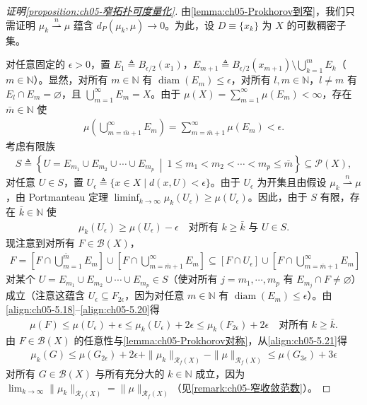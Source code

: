 \documentclass[../../main.tex]{subfiles}%
\begin{document}
\begin{proof}[证明\cref{proposition:ch05-窄拓扑可度量化}]
由\cref{lemma:ch05-Prokhorov到窄}，我们只需证明 $\mu_k\stackrel{n}{\rightharpoonup}\mu$ 蕴含 $d_P(\mu_k,\mu)\to0$。为此，设 $D\equiv\{x_k\}$ 为 $X$ 的可数稠密子集。

对任意固定的 $\epsilon>0$，置 $E_1\triangleq B_{\epsilon/2}(x_1)$，$E_{m+1}\triangleq B_{\epsilon/2}(x_{m+1})\setminus\bigcup_{k=1}^m E_k$（$m\in\mathbb{N}$）。显然，对所有 $m\in\mathbb{N}$ 有 $\operatorname{diam}(E_m)\leqslant\epsilon$，对所有 $l,m\in\mathbb{N}$，$l\neq m$ 有 $E_l\cap E_m=\varnothing $，且 $\bigcup_{m=1}^\infty E_m=X$。由于 $\mu(X)=\sum_{m=1}^\infty\mu(E_m)<\infty$，存在 $\bar{m}\in\mathbb{N}$ 使
\begin{align}
\mu\!\left(\bigcup_{m=\bar{m}+1}^\infty E_m\right)
=\sum_{m=\bar{m}+1}^\infty\mu(E_m)<\epsilon.\label{align:ch05-5.18}
\end{align}
考虑有限族
\begin{align*}
S\triangleq \left\{U=E_{m_1}\cup E_{m_2}\cup\cdots\cup E_{m_p}\ \middle|\
1\leqslant m_1<m_2<\cdots<m_p\leqslant\bar{m}\right\}\subseteq\mathcal{P}(X),
\end{align*}
对任意 $U\in S$，置 $U_\epsilon\triangleq \{x\in X\mid d(x,U)<\epsilon\}$。由于 $U_\epsilon$ 为开集且由假设 $\mu_k\stackrel{n}{\rightharpoonup}\mu$，由 Portmanteau 定理 $\liminf_{k\to\infty}\mu_k(U_\epsilon)\geqslant\mu(U_\epsilon)$。因此，由于 $S$ 有限，存在 $\bar{k}\in\mathbb{N}$ 使
\begin{align}
\mu_k(U_\epsilon)\geqslant\mu(U_\epsilon)-\epsilon
\quad\text{对所有 }k\geqslant\bar{k}\text{ 与 }U\in S.\label{align:ch05-5.19}
\end{align}
现注意到对所有 $F\in\mathscr{B}(X)$，
\begin{align}
F=\left[F\cap\bigcup_{m=1}^{\bar{m}}E_m\right]
\cup\left[F\cap\bigcup_{m=\bar{m}+1}^\infty E_m\right]
\subseteq[F\cap U_\epsilon]\cup\left[F\cap\bigcup_{m=\bar{m}+1}^\infty E_m\right]\label{align:ch05-5.20}
\end{align}
对某个 $U=E_{m_1}\cup E_{m_2}\cup\cdots\cup E_{m_p}\in S$（使对所有 $j=m_1,\cdots ,m_p$ 有 $E_{m_j}\cap F\neq\varnothing $）成立（注意这蕴含 $U_\epsilon\subseteq F_{2\epsilon}$，因为对任意 $m\in\mathbb{N}$ 有 $\operatorname{diam}(E_m)\leqslant\epsilon$）。由\eqref{align:ch05-5.18}–\eqref{align:ch05-5.20}得
\begin{align}
\mu(F)\leqslant\mu(U_\epsilon)+\epsilon
\leqslant\mu_k(U_\epsilon)+2\epsilon
\leqslant\mu_k(F_{2\epsilon})+2\epsilon
\quad\text{对所有 }k\geqslant\bar{k}.\label{align:ch05-5.21}
\end{align}
由 $F\in\mathscr{B}(X)$ 的任意性与\cref{lemma:ch05-Prokhorov对称}，从\eqref{align:ch05-5.21}得
\begin{align}
\mu_k(G)\leqslant\mu(G_{2\epsilon})+2\epsilon
+\|\mu_k\|_{\mathscr{R}_f(X)}-\|\mu\|_{\mathscr{R}_f(X)}
\leqslant\mu(G_{3\epsilon})+3\epsilon\label{align:ch05-5.22}
\end{align}
对所有 $G\in\mathscr{B}(X)$ 与所有充分大的 $k\in\mathbb{N}$ 成立，因为 $\lim_{k\to\infty}\|\mu_k\|_{\mathscr{R}_f(X)}=\|\mu\|_{\mathscr{R}_f(X)}$（见\cref{remark:ch05-窄收敛范数}）。


\end{proof}
\end{document}
